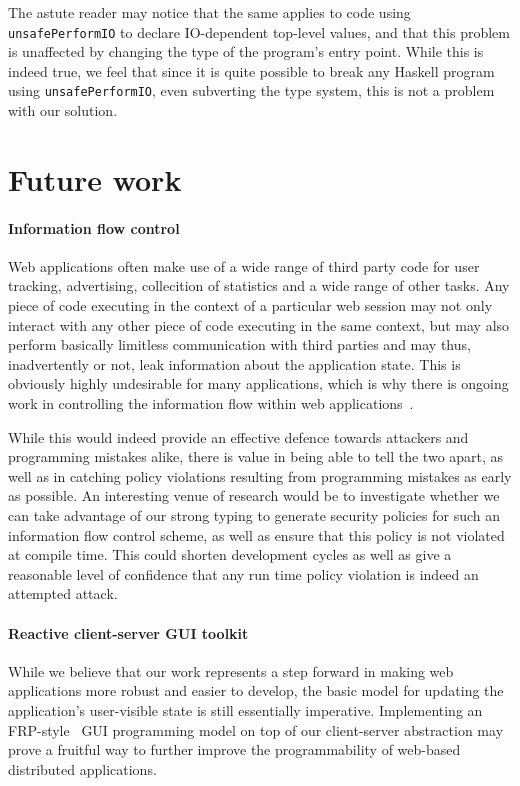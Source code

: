 \documentclass[preprint]{sigplanconf}
\begin{document}
The astute reader may notice that the same applies to code using
\lstinline!unsafePerformIO! to declare IO-dependent top-level values, and that
this problem is unaffected by changing the type of the program's entry point.
While this is indeed true, we feel that since it is quite possible to break
any Haskell program using \lstinline!unsafePerformIO!, even subverting the type
system, this is not a problem with our solution.

\section{Future work}

\paragraph{Information flow control} Web applications often make use of a wide
range of third party code for user tracking, advertising, collecition of
statistics and a wide range of other tasks. Any piece of code executing in the
context of a particular web session may not only interact with any other piece
of code executing in the same context, but may also perform basically limitless
communication with third parties and may thus, inadvertently or not, leak
information about the application state. This is obviously highly undesirable
for many applications, which is why there is ongoing work in controlling the
information flow within web applications\ \cite{jsflow}.

While this would indeed provide an effective defence towards attackers and
programming mistakes alike, there is value in being able to tell the two apart,
as well as in catching policy violations resulting from programming mistakes
as early as possible. An interesting venue of research would be to investigate
whether we can take advantage of our strong typing to generate security policies
for such an information flow control scheme, as well as ensure that this policy
is not violated at compile time. This could shorten development cycles as well
as give a reasonable level of confidence that any run time policy violation is
indeed an attempted attack.

\paragraph{Reactive client-server GUI toolkit} While we believe that our work
represents a step forward in making web applications more robust and easier to
develop, the basic model for updating the application's user-visible state is
still essentially imperative. Implementing an FRP-style\ \cite{ppfrp} GUI
programming model on top of our client-server abstraction may prove a fruitful
way to further improve the programmability of web-based distributed
applications.
\end{document}
